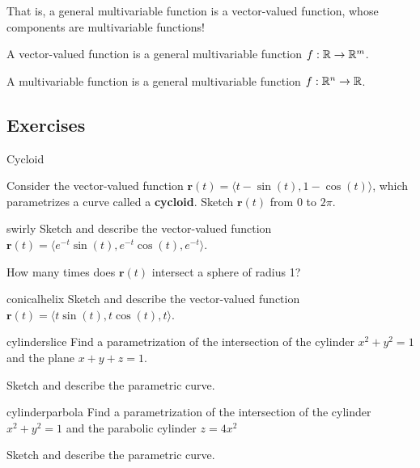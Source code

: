 That is, a general multivariable function is a vector-valued function, whose components are multivariable functions!

\begin{example}
A vector-valued function is a general multivariable function $f : \mathbb{R} \to \mathbb{R}^m$.
\end{example}

\begin{example}
A multivariable function is a general multivariable function $f : \mathbb{R}^n \to \mathbb{R}$.
\end{example}


\subsection{Exercises}

\begin{problem}{Cycloid}

Consider the vector-valued function $\bm{r}(t) = \langle t-\sin(t), 1-\cos(t) \rangle$, which parametrizes a curve called a \textbf{cycloid}.  Sketch $\bm{r}(t)$ from $0$ to $2\pi$.

\end{problem}

\begin{problem}{swirly}
Sketch and describe the vector-valued function $\bm{r}(t) = \langle e^{-t}\sin(t), e^{-t}\cos(t), e^{-t} \rangle$.  

\begin{subproblems}
\item How many times does $\bm{r}(t)$ intersect a sphere of radius 1?
\end{subproblems}

\end{problem}

\begin{problem}{conicalhelix}
Sketch and describe the vector-valued function $\bm{r}(t) = \langle t\sin(t), t\cos(t), t \rangle$.  
\end{problem}

\begin{problem}{cylinderslice}
Find a parametrization of the intersection of the cylinder $x^2 + y^2 = 1$ and the plane $x + y + z = 1$.

Sketch and describe the parametric curve.
\end{problem}

\begin{problem}{cylinderparbola}
Find a parametrization of the intersection of the cylinder $x^2 + y^2 = 1$ and the parabolic cylinder $z = 4x^2$

Sketch and describe the parametric curve.
\end{problem}

